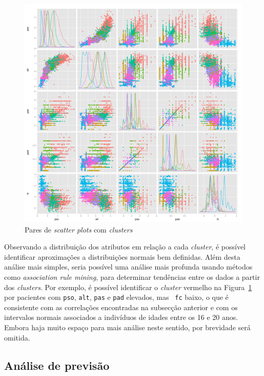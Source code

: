 \documentclass[10pt, conference, compsocconf]{IEEEtran}
\begin{document}
\begin{figure}[!ht]
  \centering
  \includegraphics[scale=0.5]{img/amv_kmsm.png}
  \caption{Pares de \textit{scatter plots} com \textit{clusters}}
  \label{fig:amksm}
\end{figure}

Observando a distribuição dos atributos em relação a cada
\textit{cluster}, é possível identificar aproximações a distribuições
normais bem definidas. Além desta análise mais simples, seria possível
uma análise mais profunda usando métodos como \textit{association rule
  mining}, para determinar tendências entre os dados a partir dos
\textit{clusters}. Por exemplo, é possível identificar o
\textit{cluster} vermelho na Figura~\ref{fig:amksm} por pacientes com
       {\tt pso}, {\tt alt}, {\tt pas} e {\tt pad} elevados, mas {\tt
         fc} baixo, o que é consistente com as correlações encontradas
       na subsecção anterior e com os intervalos normais associados a
       indivíduos de idades entre os 16 e 20 anos. Embora haja muito
       espaço para mais análise neste sentido, por brevidade será
       omitida.


\subsection{Análise de previsão}
\end{document}
